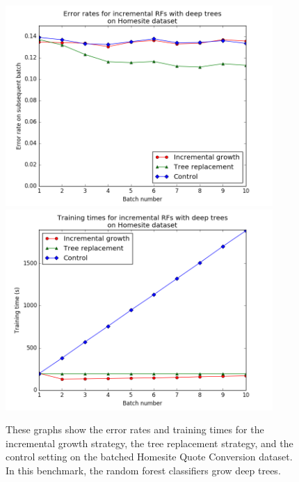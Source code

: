 \begin{figure}
  \centering
  \includegraphics[width=4.0in]{g1}\\
  \includegraphics[width=4.0in]{g1_1}
  \caption{These graphs show the error rates and training times for the
  incremental growth strategy, the tree replacement strategy, and the control
  setting on the batched Homesite Quote Conversion dataset. In this benchmark,
  the random forest classifiers grow deep trees.}
  \label{fig:homesite}
\end{figure}

